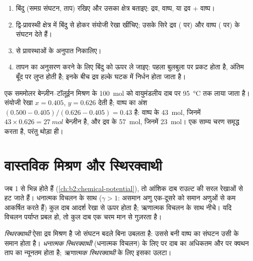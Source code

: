\begin{method}[द्वि-घटकी आरेख पढ़ना]\label{met:b2:liquid-vapour-diagrams:read-diagram}
\begin{enumerate}
  \item बिंदु (समग्र संघटन, ताप) रखिए और उसका
        क्षेत्र बताइए: द्रव, वाष्प, या द्रव + वाष्प।
  \item द्वि-प्रावस्थी क्षेत्र में बिंदु से होकर संयोजी रेखा खींचिए; उसके सिरे
        द्रव ( पर) और
        वाष्प ( पर) के संघटन देते हैं।
  \item {} से प्रावस्थाओं के अनुपात निकालिए।
  \item तापन का अनुसरण करने के लिए बिंदु को ऊपर ले जाइए: पहला बुलबुला
         पर प्रकट होता है, अंतिम बूँद  पर लुप्त होती है;
        इनके बीच द्रव हल्के घटक में निर्धन होता जाता है।
\end{enumerate}
\end{method}

\begin{example}\label{ex:b2:liquid-vapour-diagrams:flash}
एक सममोलर बेन्ज़ीन--टॉलूईन मिश्रण के \qty{100}{mol} को वायुमंडलीय दाब पर
\qty{95}{\degreeCelsius} तक लाया जाता है। संयोजी रेखा $x =
0.405$, $y = 0.626$ देती है; वाष्प का अंश $(0.500 - 0.405)/(0.626 - 0.405) =
0.43$ है: वाष्प के \qty{43}{mol}, जिनमें $43 \times 0.626 = \qty{27}{mol}$
बेन्ज़ीन है, और द्रव के \qty{57}{mol}, जिनमें \qty{23}{mol}। एक साम्य चरण
समृद्ध करता है, परंतु थोड़ा ही।
\end{example}

\section{वास्तविक मिश्रण और स्थिरक्वाथी}

जब  1 से भिन्न होते हैं (\cref{ch:b2:chemical-potential}),
तो आंशिक दाब राउल्ट की सरल रेखाओं से हट जाते हैं। धनात्मक
विचलन के साथ ($\gamma > 1$: असमान अणु एक-दूसरे को समान अणुओं से कम
आकर्षित करते हैं) कुल दाब आदर्श रेखा से ऊपर होता है; ऋणात्मक विचलन के साथ
नीचे। यदि विचलन पर्याप्त प्रबल हो, तो कुल दाब एक
चरम मान से गुज़रता है।

\begin{definition}[स्थिरक्वाथी]\label{def:b2:liquid-vapour-diagrams:azeotrope}
\emph{स्थिरक्वाथी} ऐसा द्रव मिश्रण है जो संघटन बदले बिना
उबलता है: उससे बनी वाष्प का संघटन उसी के समान होता है।
\emph{धनात्मक स्थिरक्वाथी} (धनात्मक विचलन) के लिए
 पर दाब का अधिकतम और  पर क्वथन
ताप का न्यूनतम होता है; \emph{ऋणात्मक स्थिरक्वाथी}
के लिए इसका उलटा।
\end{definition}

